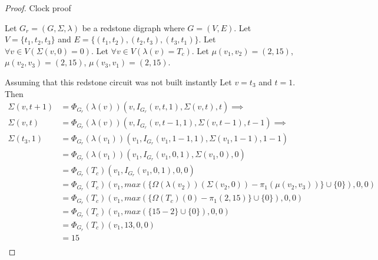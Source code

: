 \documentclass{article}
\begin{document}
\begin{proof} Clock proof
	
	\begin{outline}
		\1 Let \(G_{r} = (G, \Sigma, \lambda)\) be a redstone digraph where \(G = (V, E)\). 
		\1 Let \(V = \{t_{1}, t_{2}, t_{3}\}\) and \(E = \{(t_{1}, t_{2}), (t_{2}, t_{3}), (t_{3}, t_{1})\}\).
		\1 Let \(\forall v \in V(\Sigma(v, 0) = 0)\).
		\1 Let \(\forall v \in V(\lambda(v) = T_{c})\).
		\1 Let \(\mu(v_{1}, v_{2}) = (2, 15)\), \(\mu(v_{2}, v_{3}) = (2, 15)\), \(\mu(v_{3}, v_{1}) = (2, 15)\).
	\end{outline}

	Assuming that this redstone circuit was not built instantly
	Let \(v = t_{3}\) and \(t = 1\). \\
	Then
	\begin{align*}
		\Sigma(v, t + 1) &= \Phi_{G_{r}}(\lambda(v))(v, I_{G_{r}}(v, t, 1), \Sigma(v, t), t) \implies \\
		\Sigma(v, t) &= \Phi_{G_{r}}(\lambda(v))(v, I_{G_{r}}(v, t - 1, 1), \Sigma(v, t - 1), t - 1) \implies \\
		\Sigma(t_{3}, 1) &= \Phi_{G_{r}}(\lambda(v_{1}))(v_{1}, I_{G_{r}}(v_{1}, 1 - 1, 1), \Sigma(v_{1}, 1 - 1), 1 - 1)\\
						 &= \Phi_{G_{r}}(\lambda(v_{1}))(v_{1}, I_{G_{r}}(v_{1}, 0, 1), \Sigma(v_{1}, 0), 0) \\
						 &= \Phi_{G_{r}}(T_{c})(v_{1}, I_{G_{r}}(v_{1}, 0, 1), 0, 0) \\
						 &= \Phi_{G_{r}}(T_{c})(v_{1}, max(\{\Omega(\lambda(v_{2}))(\Sigma(v_{2}, 0)) - \pi_{1}(\mu(v_{2}, v_{3}))\} \cup \{0\}), 0, 0) \\
						 &= \Phi_{G_{r}}(T_{c})(v_{1}, max(\{\Omega(T_{c})(0) - \pi_{1}(2, 15)\} \cup \{0\}), 0, 0) \\
						 &= \Phi_{G_{r}}(T_{c})(v_{1}, max(\{15 - 2\} \cup \{0\}), 0, 0) \\
						 &= \Phi_{G_{r}}(T_{c})(v_{1}, 13, 0, 0) \\
						 &= 15 \\
	\end{align*}


\end{proof}
\end{document}
